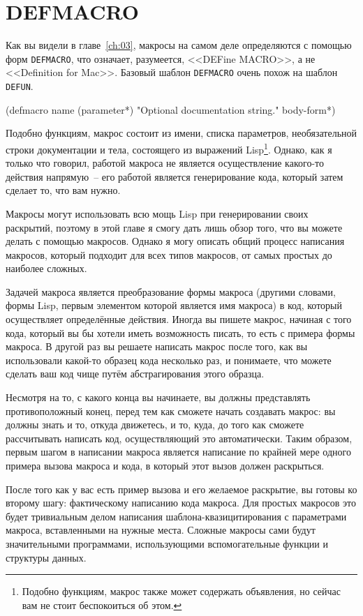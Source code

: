 \section{DEFMACRO}

Как вы видели в главе~\ref{ch:03}, макросы на самом деле определяются с помощью форм
\lstinline{DEFMACRO}, что означает, разумеется, <<DEFine MACRO>>, а не <<Definition for
Mac>>. Базовый шаблон \lstinline{DEFMACRO} очень похож на шаблон \lstinline{DEFUN}.

\begin{myverb}
  (defmacro name (parameter*)
    "Optional documentation string."
    body-form*)
\end{myverb}

Подобно функциям, макрос состоит из имени, списка параметров, необязательной строки
документации и тела, состоящего из выражений Lisp\footnote{Подобно функциям, макрос также
  может содержать объявления, но сейчас вам не стоит беспокоиться об этом.}. Однако, как я
только что говорил, работой макроса не является осуществление какого-то действия
напрямую~-- его работой является генерирование кода, который затем сделает то, что вам
нужно.

Макросы могут использовать всю мощь Lisp при генерировании своих раскрытий, поэтому в этой
главе я смогу дать лишь обзор того, что вы можете делать с помощью макросов. Однако я могу
описать общий процесс написания макросов, который подходит для всех типов макросов, от
самых простых до наиболее сложных.

Задачей макроса является преобразование формы макроса (другими словами, формы Lisp, первым
элементом которой является имя макроса) в код, который осуществляет определённые
действия. Иногда вы пишете макрос, начиная с того кода, который вы бы хотели иметь
возможность писать, то есть с примера формы макроса. В другой раз вы решаете написать
макрос после того, как вы использовали какой-то образец кода несколько раз, и понимаете,
что можете сделать ваш код чище путём абстрагирования этого образца.

Несмотря на то, с какого конца вы начинаете, вы должны представлять противоположный конец,
перед тем как сможете начать создавать макрос: вы должны знать и то, откуда движетесь, и
то, куда, до того как сможете рассчитывать написать код, осуществляющий это
автоматически. Таким образом, первым шагом в написании макроса является написание по
крайней мере одного примера вызова макроса и кода, в который этот вызов должен
раскрыться.

После того как у вас есть пример вызова и его желаемое раскрытие, вы готовы ко второму
шагу: фактическому написанию кода макроса. Для простых макросов это будет тривиальным
делом написания шаблона-квазицитирования с параметрами макроса, вставленными на нужные
места. Сложные макросы сами будут значительными программами, использующими вспомогательные
функции и структуры данных.

